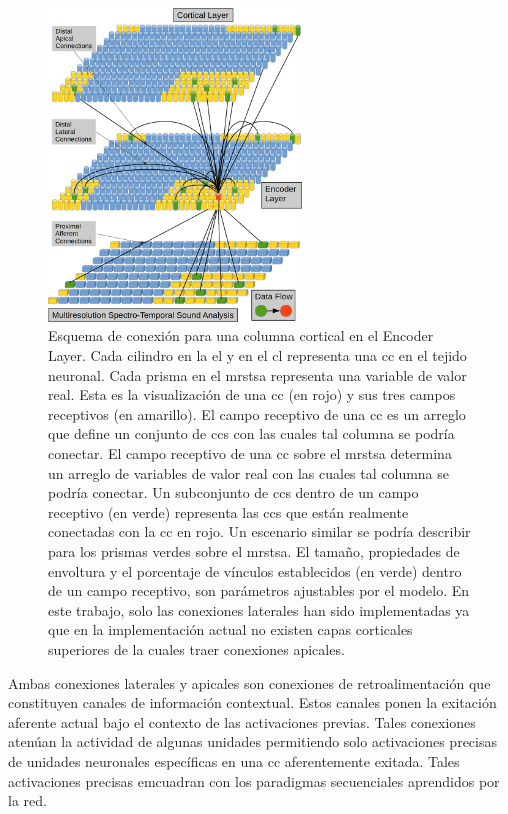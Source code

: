 {\begin{figure}[h!]
    \centering
    \includegraphics[width=0.6\textwidth]{EncoderColumnConnections.png}
    \caption{Esquema de conexión para una columna cortical en el Encoder Layer.
	    Cada cilindro en la \gls{el} y en el \gls{cl} representa una \gls{cc} en el tejido neuronal.
	    Cada prisma en el \gls{mrstsa} representa una variable de valor real.
	    Esta es la visualización de una \gls{cc} (en rojo) y sus tres campos receptivos (en amarillo).
	    El campo receptivo de una \gls{cc} es un arreglo que define un conjunto de \glspl{cc}
	    con las cuales tal columna se podría conectar.
	    El campo receptivo de una \gls{cc} sobre el \gls{mrstsa} determina un arreglo de variables de valor real
	    con las cuales tal columna se podría conectar.
	    Un subconjunto de \glspl{cc} dentro de un campo receptivo (en verde) representa las \glspl{cc} que están realmente conectadas
	    con la \gls{cc} en rojo. Un escenario similar se podría describir para los prismas verdes sobre el \gls{mrstsa}.
	    El tamaño, propiedades de envoltura y el porcentaje de vínculos establecidos (en verde) dentro de un campo receptivo, son parámetros ajustables por el modelo.
	    En este trabajo, solo las conexiones laterales han sido implementadas ya que en la implementación actual no existen capas corticales superiores de la cuales traer conexiones apicales.}
    \label{fig:EncoderColumnConnections}
\end{figure}

Ambas conexiones laterales y apicales son conexiones de retroalimentación que constituyen canales de información contextual.
Estos canales ponen la exitación aferente actual bajo el contexto de las activaciones previas.
Tales conexiones atenúan la actividad de algunas unidades permitiendo solo activaciones precisas
de unidades neuronales específicas en una \gls{cc} aferentemente exitada.
Tales activaciones precisas emcuadran con los paradigmas secuenciales aprendidos por la red.

}
